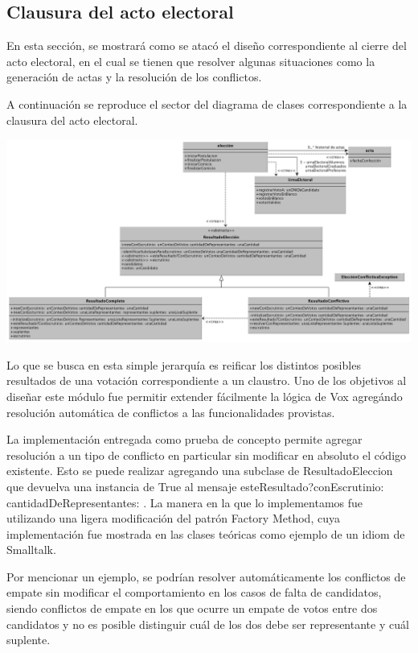 \subsection{Clausura del acto electoral}

En esta secci\'on, se mostrar\'a como se atac\'o el diseño correspondiente al cierre del acto electoral, en el cual se tienen que resolver algunas situaciones como la generaci\'on de actas y la resoluci\'on de los conflictos.

A continuaci\'on se reproduce el sector del diagrama de clases correspondiente a la clausura del acto electoral.

\begin{center}
\includegraphics[scale=0.19]{diagramas/modeloDeClasesResultados.png}
\end{center}


Lo que se busca en esta simple jerarquía es reificar los distintos posibles resultados de una votación correspondiente a un claustro. Uno de los objetivos al diseñar este módulo fue permitir extender fácilmente la lógica de Vox agregándo resolución automática de conflictos a las funcionalidades provistas.

La implementación entregada como prueba de concepto permite agregar resolución a un tipo de conflicto en particular sin modificar en absoluto el código existente. Esto se puede realizar agregando una subclase de ResultadoEleccion que devuelva una instancia de True al mensaje esteResultado?conEscrutinio: cantidadDeRepresentantes: . La manera en la que lo implementamos fue utilizando una ligera modificación del patrón Factory Method, cuya implementación fue mostrada en las clases teóricas como ejemplo de un idiom de Smalltalk. 

Por mencionar un ejemplo, se podrían resolver automáticamente los conflictos de empate sin modificar el comportamiento en los casos de falta de candidatos, siendo conflictos de empate en los que ocurre un empate de votos entre dos candidatos y no es posible distinguir cuál de los dos debe ser representante y cuál suplente.

